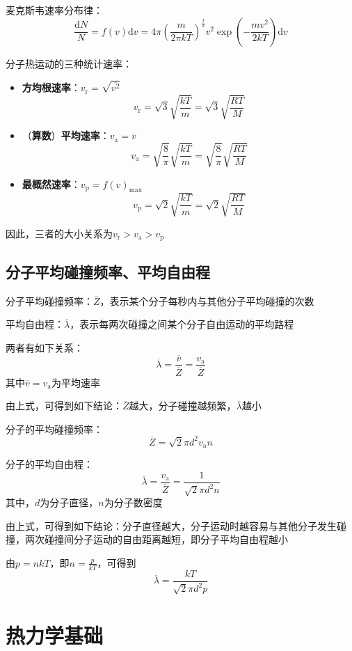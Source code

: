 \documentclass[12pt, a4paper, twoside]{ctexbook}
\begin{document}
{\sonti 麦克斯韦速率分布律}：
$$
\frac{\mathrm{d}N}{N}=f\left(v\right)\mathrm{d}v=4\pi\left(\frac{m}{2\pi kT}\right)^{\frac{3}{2}}v^2\exp\left(-\frac{mv^2}{2kT}\right)\mathrm{d}v
$$

{\sonti 分子热运动的三种统计速率}：
\begin{itemize}
    \item \textbf{方均根速率}：$v_\mathrm{r}=\sqrt{\overline{v^2}}$
    $$
    v_\mathrm{r}=\sqrt{3}\sqrt{\frac{kT}{m}}=\sqrt{3}\sqrt{\frac{RT}{M}}
    $$
    \item {\sonti （}\textbf{算数}{\sonti ）}\textbf{平均速率}：$v_\mathrm{a}=\overline{v}$
    $$
    v_\mathrm{a}=\sqrt{\frac{8}{\pi}}\sqrt{\frac{kT}{m}}=\sqrt{\frac{8}{\pi}}\sqrt{\frac{RT}{M}}
    $$
    \item \textbf{最概然速率}：$v_\mathrm{p}=f\left(v\right)_\mathrm{max}$
    $$
    v_\mathrm{p}=\sqrt{2}\sqrt{\frac{kT}{m}}=\sqrt{2}\sqrt{\frac{RT}{M}}
    $$
\end{itemize}

因此，三者的大小关系为$v_\mathrm{r}>v_\mathrm{a}>v_\mathrm{p}$
\section{分子平均碰撞频率、平均自由程}
{\sonti 分子平均碰撞频率}：$\overline{Z}$，表示某个分子每秒内与其他分子平均碰撞的次数

{\sonti 平均自由程}：$\overline{\lambda}$，表示每两次碰撞之间某个分子自由运动的平均路程

两者有如下关系：
$$
\overline{\lambda}=\frac{\overline{v}}{\overline{Z}}=\frac{v_\mathrm{a}}{\overline{Z}}
$$
其中$\overline{v}=v_\mathrm{a}$为平均速率

由上式，可得到如下结论：$\overline{Z}$越大，分子碰撞越频繁，$\overline{\lambda}$越小

{\sonti 分子的平均碰撞频率}：
$$
\overline{Z}=\sqrt{2}\pi d^2 v_\mathrm{a} n
$$

{\sonti 分子的平均自由程}：
$$
\overline{\lambda}=\frac{v_\mathrm{a}}{\overline{Z}}=\frac{1}{\sqrt{2}\pi d^2 n}
$$
其中，$d$为分子直径，$n$为分子数密度

由上式，可得到如下结论：分子直径越大，分子运动时越容易与其他分子发生碰撞，两次碰撞间分子运动的自由距离越短，即分子平均自由程越小

由$p=nkT$，即$n=\frac{p}{kT}$，可得到
$$
\overline{\lambda}=\frac{kT}{\sqrt{2}\pi d^2 p}
$$
\chapter{热力学基础}
\newpage
\end{document}
